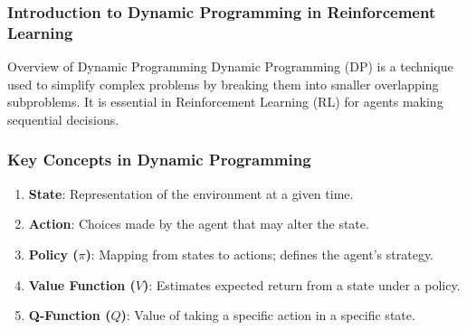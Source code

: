 \documentclass[aspectratio=169]{beamer}
\begin{document}
\frame{\titlepage}

\begin{frame}[fragile]
    \frametitle{Introduction to Dynamic Programming in Reinforcement Learning}
    \begin{block}{Overview of Dynamic Programming}
        Dynamic Programming (DP) is a technique used to simplify complex problems by breaking them into smaller overlapping subproblems. It is essential in Reinforcement Learning (RL) for agents making sequential decisions.
    \end{block}
\end{frame}

\begin{frame}[fragile]
    \frametitle{Key Concepts in Dynamic Programming}
    \begin{enumerate}
        \item \textbf{State}: Representation of the environment at a given time.
        \item \textbf{Action}: Choices made by the agent that may alter the state.
        \item \textbf{Policy ($\pi$)}: Mapping from states to actions; defines the agent's strategy.
        \item \textbf{Value Function ($V$)}: Estimates expected return from a state under a policy.
        \item \textbf{Q-Function ($Q$)}: Value of taking a specific action in a specific state.
    \end{enumerate}
\end{frame}
\end{document}
